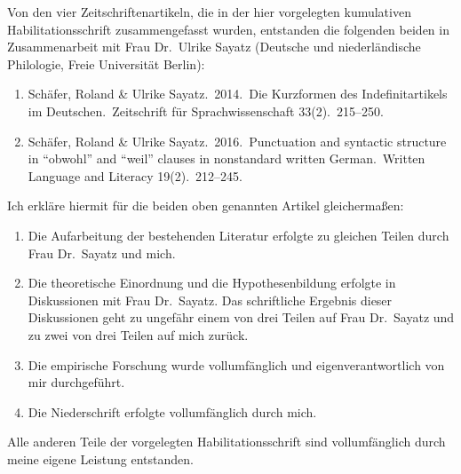 \documentclass[a4paper, biblatex, charis, linguex]{glossa}
\begin{document}
Von den vier Zeitschriftenartikeln, die in der hier vorgelegten kumulativen Habilitationsschrift zusammengefasst wurden, entstanden die folgenden beiden in Zusammenarbeit mit Frau Dr.\ Ulrike Sayatz (Deutsche und niederländische Philologie, Freie Universität Berlin):

\vspace{1\baselineskip}

\begin{enumerate}[label=\arabic*.]
  \item Schäfer, Roland \& Ulrike Sayatz.\ 2014.\ Die Kurzformen des Indefinit\-artikels im Deutschen.\ Zeitschrift für Sprachwissenschaft 33(2).\ 215--250.
  \item Schäfer, Roland \& Ulrike Sayatz.\ 2016.\ Punctuation and syntactic structure in ``obwohl'' and ``weil'' clauses in nonstandard written German.\ Written Language and Literacy 19(2).\ 212--245.
\end{enumerate}

\vspace{1\baselineskip}

\noindent Ich erkläre hiermit für die beiden oben genannten Artikel gleichermaßen:

\vspace{1\baselineskip}

\begin{enumerate}[label=\arabic*.]
  \item Die Aufarbeitung der bestehenden Literatur erfolgte zu gleichen Teilen durch Frau Dr.\ Sayatz und mich.
  \item Die theoretische Einordnung und die Hypothesenbildung erfolgte in Diskussionen mit Frau Dr.\ Sayatz.
    Das schriftliche Ergebnis dieser Diskussionen geht zu ungefähr einem von drei Teilen auf Frau Dr.\ Sayatz und zu zwei von drei Teilen auf mich zurück.
  \item Die empirische Forschung wurde vollumfänglich und eigenverantwortlich von mir durchgeführt.
  \item Die Niederschrift erfolgte vollumfänglich durch mich.
\end{enumerate}

\vspace{1\baselineskip}

\noindent Alle anderen Teile der vorgelegten Habilitationsschrift sind vollumfänglich durch meine eigene Leistung entstanden.

\vspace{1.5\baselineskip}
\end{document}
